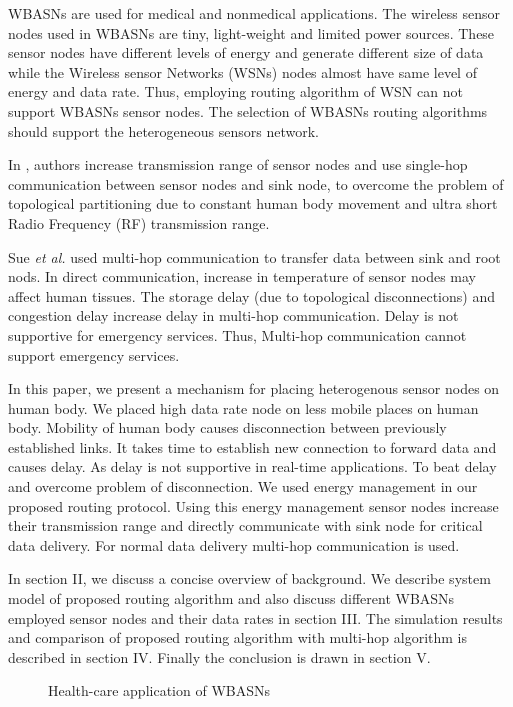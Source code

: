 \documentclass[journal]{IEEEtran}
\begin{document}
WBASNs are used for medical and nonmedical applications. The wireless sensor nodes used in WBASNs are tiny, light-weight and limited power sources. These sensor nodes have different levels of energy and generate different size of data while the Wireless sensor Networks (WSNs) nodes almost have same level of energy and data rate. Thus, employing routing algorithm of WSN can not support WBASNs sensor nodes. The selection of WBASNs routing algorithms should support the heterogeneous sensors network.

In \cite{1}, authors increase transmission range of sensor nodes and use single-hop communication between sensor nodes and sink node, to overcome the problem of topological partitioning due to constant human body movement and ultra short Radio Frequency (RF) transmission range.

Sue \textit{et al.} \cite{2} used multi-hop communication to transfer data between sink and root nods. In direct communication, increase in temperature of sensor nodes may affect human tissues. The storage delay (due to topological disconnections) and congestion delay increase delay in multi-hop communication. Delay is not supportive for emergency services.  Thus, Multi-hop communication cannot support emergency services.

In this paper, we present a mechanism for placing heterogenous sensor nodes on human body. We placed high data rate node on less mobile places on human body. Mobility of human body causes disconnection between previously established links. It takes time to establish new connection to forward data and causes delay. As delay is not supportive in real-time applications. To beat delay and overcome problem of disconnection. We used energy management in our proposed routing protocol. Using this energy management sensor nodes increase their transmission range and directly communicate with sink node for critical data delivery. For normal data delivery multi-hop communication is used.

In section II, we discuss a concise overview of background. We describe system model of proposed routing algorithm and also discuss different WBASNs employed sensor nodes and their data rates in section III. The simulation results and comparison of proposed routing algorithm with multi-hop algorithm is described in section IV. Finally the conclusion is drawn in section V.

\begin{figure*}[ht]
  \centering
  \caption{Health-care application of WBASNs}\label{fig1}
\end{figure*}
\end{document}
